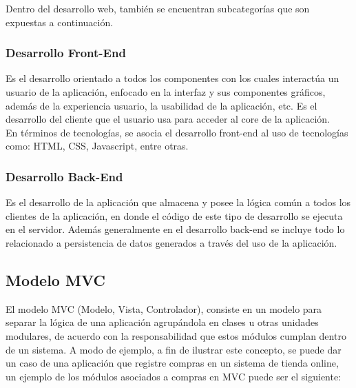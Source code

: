 Dentro del desarrollo web, también se encuentran subcategorías que son expuestas a continuación.

\subsubsection{Desarrollo Front-End} %
\label{ssub:desarrollo_front_end}

Es el desarrollo orientado a todos los componentes con los cuales interactúa un usuario de la aplicación, enfocado en la interfaz y sus componentes gráficos, además de la experiencia usuario, la usabilidad de la aplicación, etc. Es el desarrollo del cliente que el usuario usa para acceder al core de la aplicación.\\

En términos de tecnologías, se asocia el desarrollo front-end al uso de tecnologías como: HTML, CSS, Javascript, entre otras.

\subsubsection{Desarrollo Back-End} %
\label{ssub:desarrollo_back_end}


Es el desarrollo de la aplicación que almacena y posee la lógica común a todos los clientes de la aplicación, en donde el código de este tipo de desarrollo se ejecuta en el servidor. Además generalmente en el desarrollo back-end se incluye todo lo relacionado a persistencia de datos generados a través del uso de la aplicación.


\subsection{Modelo MVC} %
\label{sub:modelo_mvc}
El modelo MVC (Modelo, Vista, Controlador)\cite{mvc}, consiste en un modelo para separar la lógica de una aplicación agrupándola en clases u otras unidades modulares, de acuerdo con la responsabilidad que estos módulos cumplan dentro de un sistema. A modo de ejemplo, a fin de ilustrar este concepto, se puede dar un caso de una aplicación que registre compras en un sistema de tienda online, un ejemplo de los módulos asociados a compras en MVC puede ser el siguiente:

